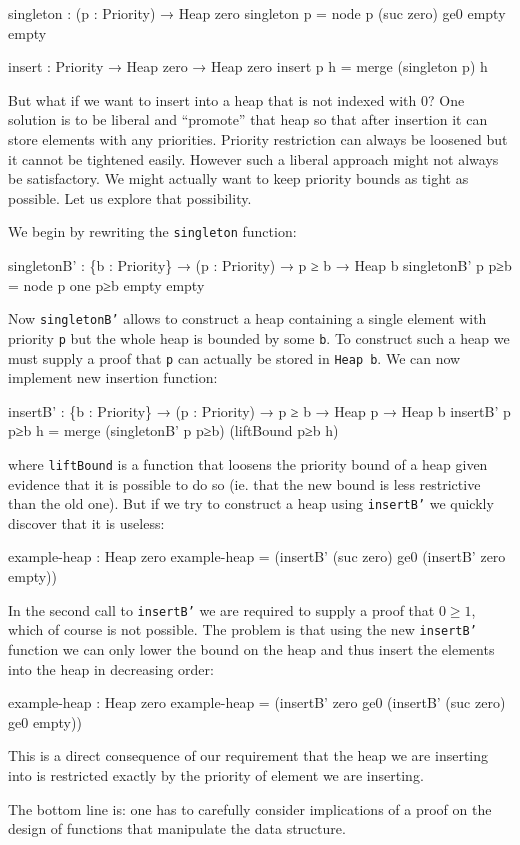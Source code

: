 \begin{code}
singleton : (p : Priority) → Heap zero
singleton p = node p (suc zero) ge0 empty empty

insert : Priority → Heap zero → Heap zero
insert p h = merge (singleton p) h
\end{code}

But what if we want to insert into a heap that is not indexed with 0? One solution is to be liberal and ``promote'' that heap so that after insertion it can store elements with any priorities. Priority restriction can always be loosened but it cannot be tightened easily. However such a liberal approach might not always be satisfactory. We might actually want to keep priority bounds as tight as possible. Let us explore that possibility.

We begin by rewriting the \texttt{singleton} function:

\begin{code}
singletonB' : \{b : Priority\} → (p : Priority) → p ≥ b → Heap b
singletonB' p p≥b = node p one p≥b empty empty
\end{code}
\noindent
Now \texttt{singletonB'} allows to construct a heap containing a single element with priority \texttt{p} but the whole heap is bounded by some \texttt{b}. To construct such a heap we must supply a proof that \texttt{p} can actually be stored in \texttt{Heap b}. We can now implement new insertion function:

\begin{small}
\begin{code}
insertB' : \{b : Priority\} → (p : Priority) → p ≥ b → Heap p → Heap b
insertB' p p≥b h = merge (singletonB' p p≥b) (liftBound p≥b h)
\end{code}
\end{small}
\noindent
where \texttt{liftBound} is a function that loosens the priority bound of a heap given evidence that it is possible to do so (ie. that the new bound is less restrictive than the old one). But if we try to construct a heap using \texttt{insertB'} we quickly discover that it is useless:

\begin{code}
example-heap : Heap zero
example-heap = (insertB' (suc zero) ge0
               (insertB' zero  empty))
\end{code}
\noindent
In the second call to \texttt{insertB'} we are required to supply a proof that $0 \ge 1$, which of course is not possible. The problem is that using the new \texttt{insertB'} function we can only lower the bound on the heap and thus insert the elements into the heap in decreasing order:

\begin{code}
example-heap : Heap zero
example-heap = (insertB' zero ge0
               (insertB' (suc zero) ge0 empty))
\end{code}
\noindent
This is a direct consequence of our requirement that the heap we are inserting into is restricted exactly by the priority of element we are inserting.

The bottom line is: one has to carefully consider implications of a proof on the design of functions that manipulate the data structure.